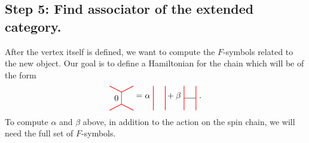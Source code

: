 \subsection*{Step 5: Find associator of the extended category.} After the vertex itself is defined, we want to compute the $F$-symbols related to the new object. 
Our goal is to define a Hamiltonian for the chain which will be of the form
	\begin{equation*}
		\begin{tikzpicture}[scale=1,baseline=(current bounding box.center)]
		\draw (.5,.25)--(.5,.75) node [pos=.5,left]{0};
		\draw [red, line width=0.25mm] (0,0) -- (.5,.25) -- (1,0);
		\draw [red, line width=0.25mm] (0,1) -- (.5,.75)--(1,1);
		\end{tikzpicture}
		=
		\alpha\ \begin{tikzpicture}[scale=1,baseline=(current bounding box.center)]
			\draw [red, line width=0.25mm] (0,0) -- (0,1);
			\draw [red, line width=0.25mm] (0.5,0) -- (0.5,1);
		\end{tikzpicture}
		+\beta\ \begin{tikzpicture}[scale=1,baseline=(current bounding box.center)]
			\draw (0,0.5) -- (0.5,0.5);
			\draw [red, line width=0.25mm] (0,0) -- (0,1);
			\draw [red, line width=0.25mm] (0.5,0) -- (0.5,1);			
		\end{tikzpicture}\ .
	\end{equation*}
To compute $\alpha$ and $\beta$ above, in addition to the action on the spin chain, we will need the full set of $F$-symbols.

